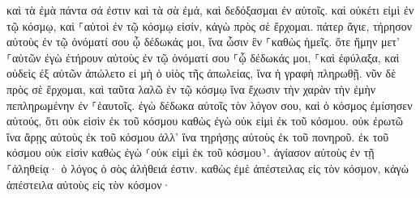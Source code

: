 \documentclass{openreader}
\begin{document}
καὶ τὰ ἐμὰ πάντα σά ἐστιν καὶ τὰ σὰ ἐμά, καὶ δεδόξασμαι ἐν αὐτοῖς. 
καὶ οὐκέτι εἰμὶ ἐν τῷ κόσμῳ, καὶ ⸀αὐτοὶ ἐν τῷ κόσμῳ εἰσίν, κἀγὼ πρὸς σὲ ἔρχομαι. πάτερ ἅγιε, τήρησον αὐτοὺς ἐν τῷ ὀνόματί σου ᾧ δέδωκάς μοι, ἵνα ὦσιν ἓν ⸀καθὼς ἡμεῖς. 
ὅτε ἤμην μετ’ ⸀αὐτῶν ἐγὼ ἐτήρουν αὐτοὺς ἐν τῷ ὀνόματί σου ⸀ᾧ δέδωκάς μοι, ⸀καὶ ἐφύλαξα, καὶ οὐδεὶς ἐξ αὐτῶν ἀπώλετο εἰ μὴ ὁ υἱὸς τῆς ἀπωλείας, ἵνα ἡ γραφὴ πληρωθῇ. 
νῦν δὲ πρὸς σὲ ἔρχομαι, καὶ ταῦτα λαλῶ ἐν τῷ κόσμῳ ἵνα ἔχωσιν τὴν χαρὰν τὴν ἐμὴν πεπληρωμένην ἐν ⸀ἑαυτοῖς. 
ἐγὼ δέδωκα αὐτοῖς τὸν λόγον σου, καὶ ὁ κόσμος ἐμίσησεν αὐτούς, ὅτι οὐκ εἰσὶν ἐκ τοῦ κόσμου καθὼς ἐγὼ οὐκ εἰμὶ ἐκ τοῦ κόσμου. 
οὐκ ἐρωτῶ ἵνα ἄρῃς αὐτοὺς ἐκ τοῦ κόσμου ἀλλ’ ἵνα τηρήσῃς αὐτοὺς ἐκ τοῦ πονηροῦ. 
ἐκ τοῦ κόσμου οὐκ εἰσὶν καθὼς ἐγὼ ⸂οὐκ εἰμὶ ἐκ τοῦ κόσμου⸃. 
ἁγίασον αὐτοὺς ἐν τῇ ⸀ἀληθείᾳ· ὁ λόγος ὁ σὸς ἀλήθειά ἐστιν. 
καθὼς ἐμὲ ἀπέστειλας εἰς τὸν κόσμον, κἀγὼ ἀπέστειλα αὐτοὺς εἰς τὸν κόσμον· 
\end{document}
